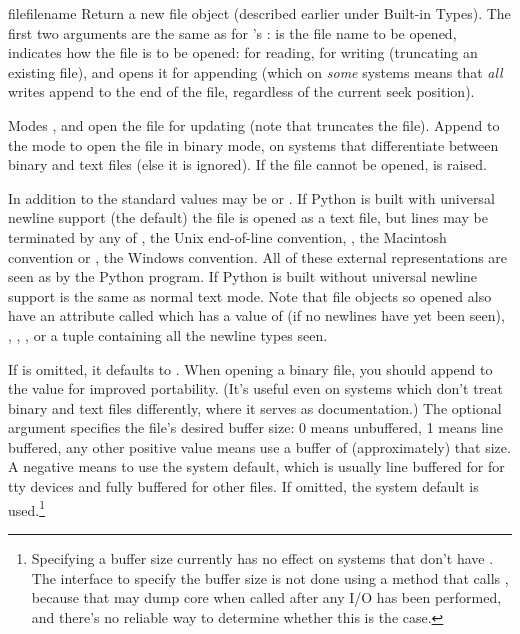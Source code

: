 \begin{funcdesc}{file}{filename}
  Return a new file object (described earlier under Built-in Types).
  The first two arguments are the same as for 's
  :  is the file name to be opened,
   indicates how the file is to be opened:  for
  reading,  for writing (truncating an existing file), and
   opens it for appending (which on \emph{some} \UNIX{}
  systems means that \emph{all} writes append to the end of the file,
  regardless of the current seek position).

  Modes ,  and  open the file for
  updating (note that  truncates the file).  Append
   to the mode to open the file in binary mode, on systems
  that differentiate between binary and text files (else it is
  ignored).  If the file cannot be opened,  is
  raised.
  
  In addition to the standard  values 
  may be  or . If Python is built with universal
  newline support (the default) the file is opened as a text file, but
  lines may be terminated by any of , the Unix end-of-line
  convention,
  , the Macintosh convention or , the Windows
  convention. All of these external representations are seen as
  by the Python program. If Python is built without universal newline support
    is the same as normal text mode.  Note that
  file objects so opened also have an attribute called
   which has a value of  (if no newlines
  have yet been seen), , , , 
  or a tuple containing all the newline types seen.

  If  is omitted, it defaults to .  When opening a
  binary file, you should append  to the  value
  for improved portability.  (It's useful even on systems which don't
  treat binary and text files differently, where it serves as
  documentation.)
  The optional  argument specifies the
  file's desired buffer size: 0 means unbuffered, 1 means line
  buffered, any other positive value means use a buffer of
  (approximately) that size.  A negative  means to use
  the system default, which is usually line buffered for for tty
  devices and fully buffered for other files.  If omitted, the system
  default is used.\footnote{
    Specifying a buffer size currently has no effect on systems that
    don't have .  The interface to specify the
    buffer size is not done using a method that calls
    , because that may dump core when called
    after any I/O has been performed, and there's no reliable way to
    determine whether this is the case.}


\end{funcdesc}
